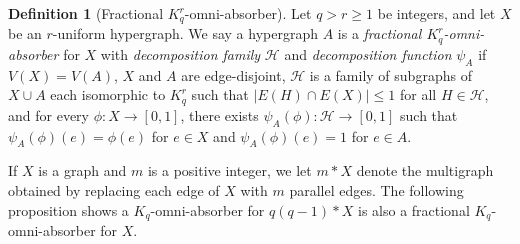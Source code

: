 \documentclass[11pt]{article}
\numberwithin{equation}{section}
\newcounter{i}
\theoremstyle{plain}
\theoremstyle{plain} %
\theoremstyle{definition}
\newtheorem{definition}[thm]{Definition}
\begin{document}
\begin{definition}[Fractional $K^r_q$-omni-absorber]
Let $q > r \geq 1$ be integers, and let $X$ be an $r$-uniform hypergraph. We say a hypergraph $A$ is a \textit{fractional $K^r_q$-omni-absorber} for $X$ with \emph{decomposition family} $\mathcal{H}$ and \emph{decomposition function} $\psi_A$ if $V(X)=V(A)$, $X$ and $A$ are edge-disjoint, $\mathcal{H}$ is a family of subgraphs of $X\cup A$ each isomorphic to $K^r_q$ such that $|E(H)\cap E(X)|\le 1$ for all $H\in\mathcal{H}$, and for every $\phi:X\rightarrow [0,1]$, there exists $\psi_A(\phi):\mathcal{H}\rightarrow [0,1]$ such that $\psi_A(\phi)(e)=\phi(e)$ for $e\in X$ and $\psi_A(\phi)(e)=1$ for $e\in A$. 
\end{definition}

If $X$ is a graph and $m$ is a positive integer, we let $m*X$ denote the multigraph obtained by replacing each edge of $X$ with $m$ parallel edges. The following proposition shows a $K_q$-omni-absorber for $q(q-1)*X$ is also a fractional $K_q$-omni-absorber for $X$. 
\end{document}
